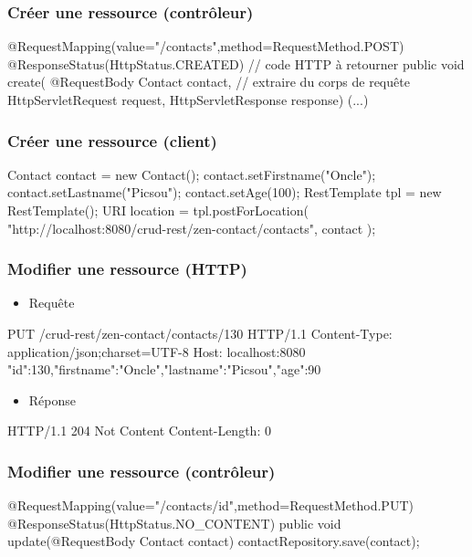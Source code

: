 \begin{frame}[fragile]
 \frametitle{Créer une ressource (contrôleur)}
 
 \begin{javacode}
@RequestMapping(value="/contacts",method=RequestMethod.POST)
@ResponseStatus(HttpStatus.CREATED)  // code HTTP \`a retourner
public void create(
      @RequestBody Contact contact,  // extraire du corps de requ\^ete
      HttpServletRequest request, 
      HttpServletResponse response) {
  (...)
}
 \end{javacode}  

\end{frame}

\begin{frame}[fragile]
 \frametitle{Créer une ressource (client)}
 
 \begin{javacode}
Contact contact = new Contact();
contact.setFirstname("Oncle");
contact.setLastname("Picsou");
contact.setAge(100);
RestTemplate tpl = new RestTemplate();
URI location = tpl.postForLocation(
  "http://localhost:8080/crud-rest/zen-contact/contacts",
  contact
);
 \end{javacode}  

\end{frame}

\begin{frame}[fragile]
 \frametitle{Modifier une ressource (HTTP)}
 
 \begin{itemize}
  \item Requête
 \end{itemize} 
 
 \begin{textcode}
PUT /crud-rest/zen-contact/contacts/130 HTTP/1.1
Content-Type: application/json;charset=UTF-8
Host: localhost:8080
{"id":130,"firstname":"Oncle","lastname":"Picsou","age":90}
 \end{textcode}
 
  \begin{itemize}
  \item Réponse
 \end{itemize} 
 
 \begin{textcode}
HTTP/1.1 204 Not Content
Content-Length: 0
 \end{textcode}

\end{frame}

\begin{frame}[fragile]
 \frametitle{Modifier une ressource (contrôleur)}
 
 \begin{javacode}
@RequestMapping(value="/contacts/{id}",method=RequestMethod.PUT)
@ResponseStatus(HttpStatus.NO_CONTENT)
public void update(@RequestBody Contact contact) {
  contactRepository.save(contact);
}
 \end{javacode}  

\end{frame}

